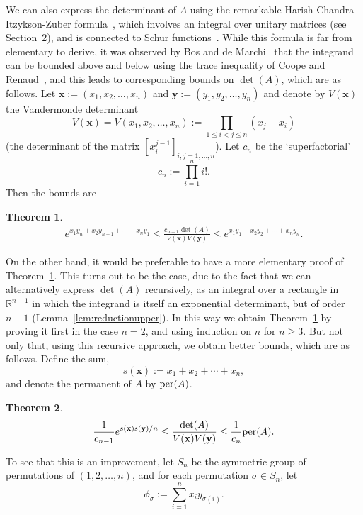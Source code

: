 \documentclass[12pt]{article}
\newcommand{\RR}{\mathbb{R}}
\def\bfx{\mathbf{x}}
\def\bfy{\mathbf{y}}
\def\per{{\rm per}}
\newtheorem{theorem}{Theorem}
\begin{document}
We can also express the determinant of $A$
using the remarkable Harish-Chandra-Itzykson-Zuber
formula~\cite{HarishChandra:1957,ItzyksonZuber:1980,GrossRichards:1989},
which involves an integral over unitary matrices (see Section~2),
and is connected to
Schur functions~\cite{Macdonald:1995,deMarchi:2001,Ait-Haddou:2019}.
While this formula is far from elementary to derive,
it was observed by Bos and de Marchi~\cite{BosdeMarchi:2011}
that the integrand can be bounded above and below using
the trace inequality of Coope and Renaud~\cite{CoopeRenaud:2009},
and this leads to corresponding bounds on $\det(A)$,
which are as follows.
Let $\bfx := (x_1,x_2,\ldots,x_n)$ and
$\bfy := (y_1,y_2,\ldots,y_n)$ and denote by $V(\bfx)$ the
Vandermonde determinant
$$ V(\bfx) = V(x_1,x_2,\ldots,x_n)
:= \prod_{1 \le i < j \le n} (x_j-x_i) $$
(the determinant of the matrix $[x_i^{j-1}]_{i,j=1,\ldots,n}$).
Let $c_n$ be the `superfactorial'
$$ c_n := \prod_{i=1}^n i!. $$
Then the bounds are
\begin{theorem}\label{thm:weak}
\begin{align*}
e^{x_1 y_n + x_2 y_{n-1} + \cdots + x_n y_1}
  \le \frac{c_{n-1} \det(A)}{V(\bfx) V(\bfy)} \le
   e^{x_1 y_1 + x_2 y_2 + \cdots + x_n y_n}.
\end{align*}
\end{theorem}
On the other hand, it would
be preferable to have a more elementary proof of Theorem~\ref{thm:weak}.
This turns out to be the case, due to the fact that
we can alternatively express $\det(A)$ recursively, as an integral over
a rectangle in $\RR^{n-1}$ in which the integrand is
itself an exponential determinant, but of order $n-1$
(Lemma~\ref{lem:reductionupper}).
In this way we obtain Theorem~\ref{thm:weak}
by proving it first in the case $n=2$, and using induction on $n$ for
$n \ge 3$.
But not only that, using this recursive approach, we obtain
better bounds, which are as follows.
Define the sum,
$$ s(\bfx) := x_1 + x_2 + \cdots + x_n, $$
and denote the permanent of $A$ by $\per(A)$.
\begin{theorem}\label{thm:main}
$$ \frac{1}{c_{n-1}} e^{s(\bfx)s(\bfy)/n}
 \le \frac{\det(A)}{V(\bfx) V(\bfy)} \le
   \frac{1}{c_n} \per(A). $$
\end{theorem}
To see that this is an improvement,
let $S_n$ be the symmetric group of permutations of
$(1,2,\ldots,n)$, and for each permutation $\sigma \in S_n$, let
\begin{equation}\label{eq:phi}
 \phi_\sigma := \sum_{i=1}^n x_i y_{\sigma(i)}.
\end{equation}
\end{document}
